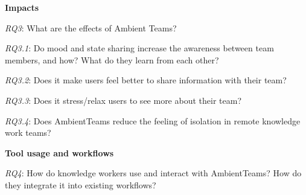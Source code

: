 \medskip\noindent\textbf{Impacts}

\smallskip\noindent\textit{RQ3}: What are the effects of Ambient Teams?

\setlength{\leftskip}{0.5cm}
\smallskip\noindent\textit{RQ3.1}: Do mood and state sharing increase the awareness between team members, and how? What do they learn from each other?

\smallskip\noindent\textit{RQ3.2}: Does it make users feel better to share information with their team?

\smallskip\noindent\textit{RQ3.3}: Does it stress/relax users to see more about their team?

\smallskip\noindent\textit{RQ3.4}: Does AmbientTeams reduce the feeling of isolation in remote knowledge work teams?

\setlength{\leftskip}{0pt}

\medskip\noindent\textbf{Tool usage and workflows}

\smallskip\noindent\textit{RQ4}: How do knowledge workers use and interact with AmbientTeams? How do they integrate it into existing workflows?
